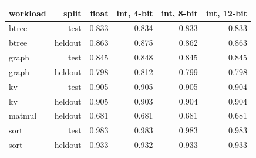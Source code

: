 \begin{tabular}{lrrrrr}
\toprule
workload & split & float & int, 4-bit & int, 8-bit & int, 12-bit \\
\midrule
btree & test & 0.833 & 0.834 & 0.833 & 0.833 \\
btree & heldout & 0.863 & 0.875 & 0.862 & 0.863 \\
graph & test & 0.845 & 0.848 & 0.845 & 0.845 \\
graph & heldout & 0.798 & 0.812 & 0.799 & 0.798 \\
kv & test & 0.905 & 0.905 & 0.905 & 0.904 \\
kv & heldout & 0.905 & 0.903 & 0.904 & 0.904 \\
matmul & heldout & 0.681 & 0.681 & 0.681 & 0.681 \\
sort & test & 0.983 & 0.983 & 0.983 & 0.983 \\
sort & heldout & 0.933 & 0.932 & 0.933 & 0.933 \\
\bottomrule
\end{tabular}
